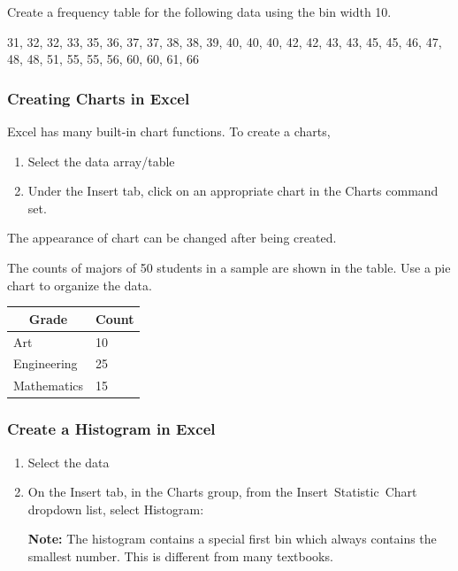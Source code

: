 \begin{exercise}
  Create a frequency table for the following data using the bin width 10.

  31, 32, 32, 33, 35, 36, 37, 37, 38, 38, 39, 40, 40, 40, 42, 42, 43, 43, 45, 45, 46, 47, 48, 48, 51, 55, 55, 56, 60, 60, 61, 66
\end{exercise}
\vspace*{6\baselineskip}

\hypertarget{creating-charts-in-excel}{%
\subsubsection{Creating Charts in Excel}\label{creating-charts-in-excel}}

Excel has many built-in chart functions. To create a charts,

\begin{enumerate}[sepno]
\item
  Select the data array/table
\item
  Under the \textsf{Insert} tab, click on an appropriate chart in the
  \textsf{Charts} command set.
\end{enumerate}

The appearance of chart can be changed after being created.

\begin{exercise}
  The counts of majors of 50 students in a sample are shown in the table.
Use a pie chart to organize the data.

\begin{tabular}[c]{l|l}
  \hline
  \multicolumn{1}{c}{\textbf{Grade}} & 
  \multicolumn{1}{c}{\textbf{Count}} \\
  \hline
  Art & 10 \\
  Engineering & 25 \\
  Mathematics & 15 \\
  \hline
\end{tabular}

\end{exercise}

\vspace*{6\baselineskip}

\hypertarget{create-histogram-charts-in-excel}{%
\subsubsection{Create a Histogram in
Excel}\label{create-histogram-charts-in-excel}}

\begin{enumerate}[sepno]
\item
  Select the data
\item
  On the \textsf{Insert} tab, in the \textsf{Charts} group, from the
  \textsf{Insert\ Statistic\ Chart} dropdown list, select
  \textsf{Histogram}:

  \textbf{Note:} The histogram contains a special first bin which always
  contains the smallest number. This is different from many textbooks.
\end{enumerate}

